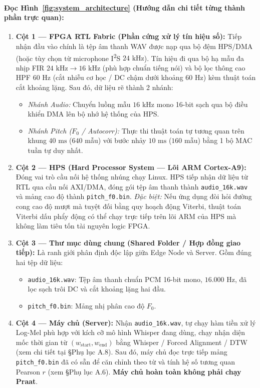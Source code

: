 \documentclass[11pt,a4paper]{article}
\begin{document}
\paragraph{Đọc Hình~\ref{fig:system_architecture} (Hướng dẫn chi tiết từng thành phần trực quan):}
\begin{enumerate}
    \setlength{\itemsep}{1.5pt}
    \item \textbf{Cột 1 --- FPGA RTL Fabric (Phần cứng xử lý tín hiệu số):} Tiếp nhận đầu vào chính là tệp âm thanh WAV được nạp qua bộ đệm HPS/DMA (hoặc tùy chọn từ microphone I\textsuperscript{2}S $24\text{ kHz}$). Tín hiệu đi qua bộ hạ mẫu đa nhịp FIR $24\text{ kHz} \to 16\text{ kHz}$ (phù hợp chuẩn tiếng nói) và bộ lọc thông cao HPF $60\text{ Hz}$ (cắt nhiễu cơ học / DC chậm dưới khoảng 60 Hz) kèm thuật toán cắt khoảng lặng. Sau đó, dữ liệu rẽ thành 2 nhánh:
    \begin{itemize}
        \item \emph{Nhánh Audio:} Chuyển luồng mẫu $16\text{ kHz}$ mono 16-bit sạch qua bộ điều khiển DMA lên bộ nhớ hệ thống của HPS.
        \item \emph{Nhánh Pitch ($F_0$ / Autocorr):} Thực thi thuật toán tự tương quan trên khung $40\text{ ms}$ ($640$ mẫu) với bước nhảy $10\text{ ms}$ ($160$ mẫu) bằng 1 bộ MAC tuần tự duy nhất.
    \end{itemize}
    \item \textbf{Cột 2 --- HPS (Hard Processor System --- Lõi ARM Cortex-A9):} Đóng vai trò cầu nối hệ thống nhúng chạy Linux. HPS tiếp nhận dữ liệu từ RTL qua cầu nối AXI/DMA, đóng gói tệp âm thanh thành \texttt{audio\_16k.wav} và mảng cao độ thành \texttt{pitch\_f0.bin}. \emph{Đặc biệt:} Nếu ứng dụng đòi hỏi đường cong cao độ mượt mà tuyệt đối bằng quy hoạch động Viterbi, thuật toán Viterbi dấu phẩy động có thể chạy trực tiếp trên lõi ARM của HPS mà không làm tiêu tốn tài nguyên logic FPGA.
    \item \textbf{Cột 3 --- Thư mục dùng chung (Shared Folder / Hợp đồng giao tiếp):} Là ranh giới phân định độc lập giữa Edge Node và Server. Gồm đúng hai tệp dữ liệu:
    \begin{itemize}
        \item \texttt{audio\_16k.wav}: Tệp âm thanh chuẩn PCM 16-bit mono, $16.000\text{ Hz}$, đã lọc sạch trôi DC và cắt khoảng lặng hai đầu.
        \item \texttt{pitch\_f0.bin}: Mảng nhị phân cao độ $F_0$.
    \end{itemize}
    \item \textbf{Cột 4 --- Máy chủ (Server):} Nhận \texttt{audio\_16k.wav}, tự chạy hàm tiền xử lý Log-Mel phù hợp với kích cỡ mô hình Whisper đang dùng, chạy nhận diện mốc thời gian từ $(w_{\text{start}}, w_{\text{end}})$ bằng Whisper / Forced Alignment / DTW (xem chi tiết tại §Phụ lục A.8). Sau đó, máy chủ đọc trực tiếp mảng \texttt{pitch\_f0.bin} đã có sẵn để căn chỉnh theo từ và tính hệ số tương quan Pearson $r$ (xem §Phụ lục A.6). \textbf{Máy chủ hoàn toàn không phải chạy Praat}.
\end{enumerate}
\end{document}
